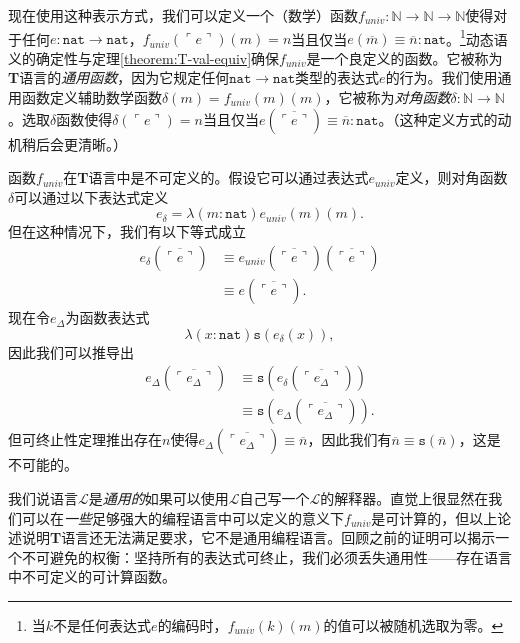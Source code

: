现在使用这种表示方式，我们可以定义一个（数学）函数$f_{univ}:\mathbb{N}\to\mathbb{N}\to\mathbb{N}$使得对于任何$e:\mathtt{nat}\to\mathtt{nat}$，$f_{univ}(\ulcorner e\urcorner)(m)=n$当且仅当$e(\overline{m})\equiv\overline{n}:\mathtt{nat}$。\footnote{当$k$不是任何表达式$e$的编码时，$f_{univ}(k)(m)$的值可以被随机选取为零。}动态语义的确定性与定理\ref{theorem:T-val-equiv}确保$f_{univ}$是一个良定义的函数。它被称为\textbf{T}语言的\textit{通用函数}，因为它规定任何$\mathtt{nat}\to\mathtt{nat}$类型的表达式$e$的行为。我们使用通用函数定义辅助数学函数$\delta(m)=f_{univ}(m)(m)$，它被称为\textit{对角函数}$\delta:\mathbb{N}\to\mathbb{N}$。选取$\delta$函数使得$\delta(\ulcorner e\urcorner)=n$当且仅当$e(\overline{\ulcorner e\urcorner})\equiv\overline{n}:\mathtt{nat}$。（这种定义方式的动机稍后会更清晰。）

函数$f_{univ}$在\textbf{T}语言中是不可定义的。假设它可以通过表达式$e_{univ}$定义，则对角函数$\delta$可以通过以下表达式定义
\begin{equation*}
e_\delta=\lambda(m:\mathtt{nat})e_{univ}(m)(m).
\end{equation*}
但在这种情况下，我们有以下等式成立
$$
\begin{array}{ll}
e_\delta(\overline{\ulcorner e\urcorner})  &\equiv e_{univ}(\overline{\ulcorner e\urcorner})(\overline{\ulcorner e\urcorner})\\
                                           &\equiv e(\overline{\ulcorner e\urcorner}).
\end{array}
$$
现在令$e_\Delta$为函数表达式
\begin{equation*}
\lambda(x:\mathtt{nat})\mathtt{s}(e_\delta(x)),
\end{equation*}
因此我们可以推导出
$$
\begin{array}{ll}
e_\Delta(\overline{\ulcorner e_\Delta\urcorner})    &\equiv\mathtt{s}(e_\delta(\overline{\ulcorner e_\Delta\urcorner}))\\
                                                    &\equiv\mathtt{s}(e_\Delta(\overline{\ulcorner e_\Delta\urcorner})).
\end{array}
$$
但可终止性定理推出存在$n$使得$e_\Delta(\overline{\ulcorner e_\Delta\urcorner})\equiv\overline{n}$，因此我们有$\overline{n}\equiv\mathtt{s}(\overline{n})$，这是不可能的。

我们说语言$\mathcal{L}$是\textit{通用的}如果可以使用$\mathcal{L}$自己写一个$\mathcal{L}$的解释器。直觉上很显然在我们可以在\textit{一些}足够强大的编程语言中可以定义的意义下$f_{univ}$是可计算的，但以上论述说明\textbf{T}语言还无法满足要求，它不是通用编程语言。回顾之前的证明可以揭示一个不可避免的权衡：坚持所有的表达式可终止，我们必须丢失通用性——存在语言中不可定义的可计算函数。

